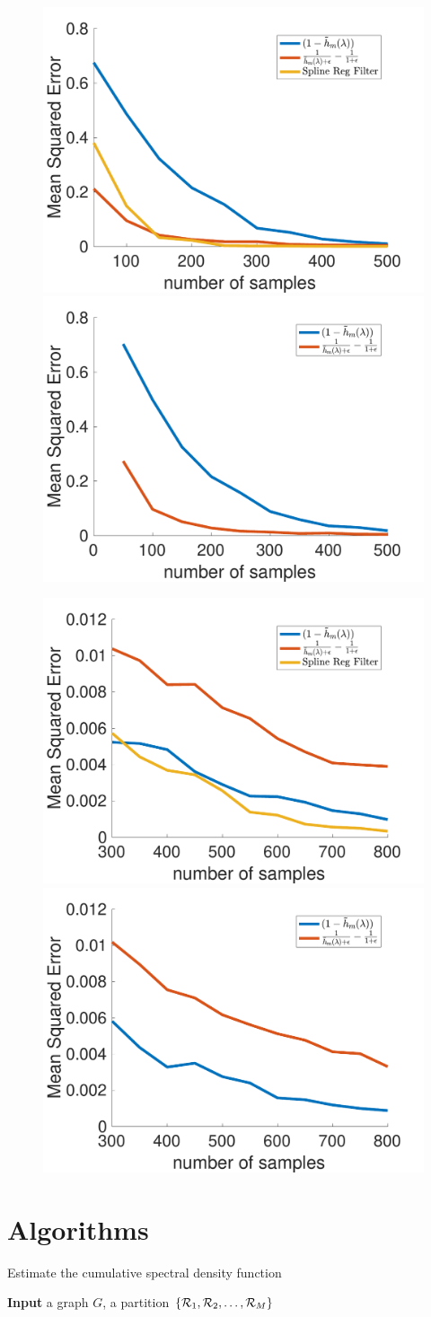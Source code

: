 \documentclass[a4paper]{article}
\theoremstyle{definition}
\begin{document}
\begin{figure}[h!]
\centering
\includegraphics[width = 5 cm]{fig_samlpes_error_trade_off_low_pass}
\includegraphics[width = 5 cm]{fig_samples_error_trade_off_low_pass_2}

\includegraphics[width = 5 cm]{fig_samples_error_trade_off_band_pass}
\includegraphics[width = 5 cm]{fig_samples_error_trade_off_band_pass2}
\end{figure}


\newpage
\section{Algorithms}

\begin{algorithm} 
\caption{Estimate the cumulative spectral density function}
\begin{algorithmic}
\State \textbf{Input} a graph $G$, a partition $\{{{\cal R}_1,{\cal R}_2,\ldots,{\cal R}_M}\}$
\end{algorithmic}
\label{Al:uniqueness}
\end{algorithm}
\end{document}
